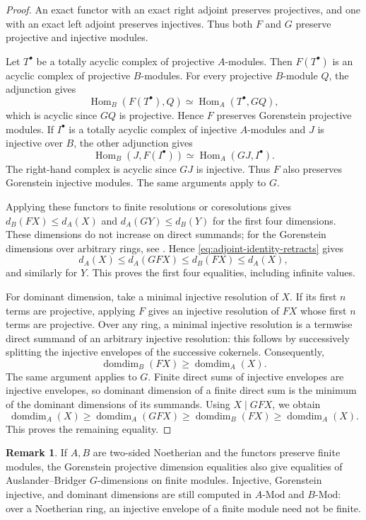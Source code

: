 \documentclass[12pt,a4paper,english,reqno]{amsart}
\numberwithin{equation}{section}
\theoremstyle{plain}
\theoremstyle{definition}
\newtheorem{remark}[theorem]{Remark}
\begin{document}
\begin{proof}
An exact functor with an exact right adjoint preserves projectives,
and one with an exact left adjoint preserves injectives.  Thus both
$F$ and $G$ preserve projective and injective modules.

Let $T^\bullet$ be a totally acyclic complex of projective $A$-modules.
Then $F(T^\bullet)$ is an acyclic complex of projective $B$-modules.
For every projective $B$-module $Q$, the adjunction gives
\[
 \operatorname{Hom}_B(F(T^\bullet),Q)
 \simeq\operatorname{Hom}_A(T^\bullet,GQ),
\]
which is acyclic since $GQ$ is projective.  Hence $F$ preserves
Gorenstein projective modules.  If $I^\bullet$ is a totally acyclic
complex of injective $A$-modules and $J$ is injective over $B$, the
other adjunction gives
\[
 \operatorname{Hom}_B(J,F(I^\bullet))
 \simeq\operatorname{Hom}_A(GJ,I^\bullet).
\]
The right-hand complex is acyclic since $GJ$ is injective.  Thus $F$
also preserves Gorenstein injective modules.  The same arguments
apply to $G$.

Applying these functors to finite resolutions or coresolutions gives
$d_B(FX)\leq d_A(X)$ and $d_A(GY)\leq d_B(Y)$ for the first four
dimensions.  These dimensions do not increase on direct summands;
for the Gorenstein dimensions over arbitrary rings, see
\cite{Holm2004}.  Hence \eqref{eq:adjoint-identity-retracts} gives
\[
 d_A(X)\leq d_A(GFX)\leq d_B(FX)\leq d_A(X),
\]
and similarly for $Y$.  This proves the first four equalities,
including infinite values.

For dominant dimension, take a minimal injective resolution of $X$.
If its first $n$ terms are projective, applying $F$ gives an injective
resolution of $FX$ whose first $n$ terms are projective.  Over any
ring, a minimal injective resolution is a termwise direct summand of
an arbitrary injective resolution: this follows by successively
splitting the injective envelopes of the successive cokernels.
Consequently,
\[
 \operatorname{domdim}_B(FX)\geq\operatorname{domdim}_A(X).
\]
The same argument applies to $G$.  Finite direct sums of injective
envelopes are injective envelopes, so dominant dimension of a finite
direct sum is the minimum of the dominant dimensions of its summands.
Using $X\mid GFX$, we obtain
\[
 \operatorname{domdim}_A(X)
 \geq\operatorname{domdim}_A(GFX)
 \geq\operatorname{domdim}_B(FX)
 \geq\operatorname{domdim}_A(X).
\]
This proves the remaining equality.
\end{proof}

\begin{remark}
\label{rem:adjoint-noetherian-dimensions}
If $A,B$ are two-sided Noetherian and the functors preserve finite
modules, the Gorenstein projective dimension equalities also give
equalities of Auslander--Bridger $G$-dimensions on finite modules.
Injective, Gorenstein injective, and dominant dimensions are still
computed in $A\text{-}\mathrm{Mod}$ and $B\text{-}\mathrm{Mod}$:
over a Noetherian ring, an injective envelope of a finite module need
not be finite.
\end{remark}
\end{document}
